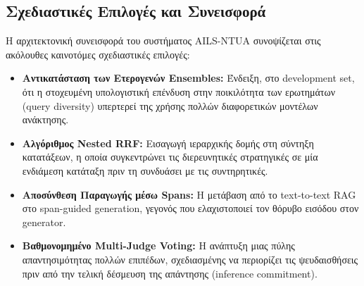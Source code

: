 \subsection{Σχεδιαστικές Επιλογές και Συνεισφορά}

Η αρχιτεκτονική συνεισφορά του συστήματος AILS-NTUA συνοψίζεται στις ακόλουθες καινοτόμες σχεδιαστικές επιλογές:
\begin{itemize}
    \item \textbf{Αντικατάσταση των Ετερογενών Ensembles:} Ένδειξη, στο development set, ότι η στοχευμένη υπολογιστική επένδυση στην ποικιλότητα των ερωτημάτων (query diversity) υπερτερεί της χρήσης πολλών διαφορετικών μοντέλων ανάκτησης.
    \item \textbf{Αλγόριθμος Nested RRF:} Εισαγωγή ιεραρχικής δομής στη σύντηξη κατατάξεων, η οποία συγκεντρώνει τις διερευνητικές στρατηγικές σε μία ενδιάμεση κατάταξη πριν τη συνδυάσει με τις συντηρητικές.
    \item \textbf{Αποσύνθεση Παραγωγής μέσω Spans:} Η μετάβαση από το text-to-text RAG στο span-guided generation, γεγονός που ελαχιστοποιεί τον θόρυβο εισόδου στον generator.
    \item \textbf{Βαθμονομημένο Multi-Judge Voting:} Η ανάπτυξη μιας πύλης απαντησιμότητας πολλών επιπέδων, σχεδιασμένης να περιορίζει τις ψευδαισθήσεις πριν από την τελική δέσμευση της απάντησης (inference commitment).
\end{itemize}